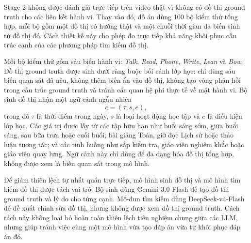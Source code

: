 Stage 2 không được đánh giá trực tiếp trên video thật vì không có đồ thị ground truth cho các liên kết hành vi. Thay vào đó, đồ án dùng 100 bộ kiểm thử tổng hợp, mỗi bộ gồm một đồ thị có hướng thật và một chuỗi thời gian đa biến sinh từ đồ thị đó. Cách thiết kế này cho phép đo trực tiếp khả năng khôi phục cấu trúc cạnh của các phương pháp tìm kiếm đồ thị.

Mỗi bộ kiểm thử gồm sáu biến hành vi: \textit{Talk}, \textit{Read}, \textit{Phone}, \textit{Write}, \textit{Lean} và \textit{Bow}. Đồ thị ground truth được sinh dưới ràng buộc bối cảnh lớp học: chỉ dùng sáu biến quan sát đã nêu, không thêm biến ẩn vào đồ thị, không tạo vòng phản hồi trong cấu trúc ground truth và tránh các quan hệ phi thực tế về mặt hành vi. Bộ sinh đồ thị nhận một ngữ cảnh ngẫu nhiên
\begin{equation}
\label{eq:synthetic-context}
    c=(\tau,s,e),
\end{equation}
trong đó \(\tau\) là thời điểm trong ngày, \(s\) là loại hoạt động học tập và \(e\) là điều kiện lớp học. Các giá trị được lấy từ các tập hữu hạn như buổi sáng sớm, giữa buổi sáng, sau bữa trưa hoặc cuối buổi; bài giảng Toán, giờ đọc Lịch sử hoặc thảo luận tương tác; và các tình huống như sắp kiểm tra, giáo viên nghiêm khắc hoặc giáo viên quay lưng. Ngữ cảnh này chỉ dùng để đa dạng hóa đồ thị tổng hợp, không được xem là biến quan sát trong mô hình.

Để giảm thiên lệch tự nhất quán trực tiếp, mô hình sinh đồ thị và mô hình tìm kiếm đồ thị được tách vai trò. Bộ sinh dùng Gemini 3.0 Flash để tạo đồ thị ground truth và lý do cho từng cạnh. Mô-đun tìm kiếm dùng DeepSeek-v4-Flash để đề xuất chỉnh sửa đồ thị, nhưng không được xem đồ thị ground truth. Cách tách này không loại bỏ hoàn toàn thiên lệch tiên nghiệm chung giữa các LLM, nhưng giúp tránh việc cùng một mô hình vừa tạo đáp án vừa tự khôi phục đáp án đó.

